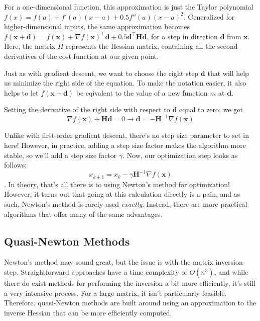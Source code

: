 \documentclass[12pt]{article}
\begin{document}
For a one-dimensional function, this approximation is just the Taylor polynomial 
\(f(x) = f(a) + f'(a)(x-a) + 0.5 f''(a)(x-a)^2\). Generalized for higher-dimensional inputs, the same approximation
becomes \(f(\mathbf{x}+\mathbf{d}) = f(\mathbf{x}) + \nabla f(\mathbf{x})^\top \mathbf{d} + 0.5\mathbf{d}^\top \mathbf{H} \mathbf{d}\),
for a step in direction \(\mathbf{d}\) from \(\mathbf{x}\). Here, the matrix \(H\) represents the Hessian matrix,
containing all the second derivatives of the cost function at our given point. 

Just as with gradient descent, we want to choose the right step \(\mathbf{d}\) that will help us
minimize the right side of the equation. To make the notation easier, it also helps to let \(f(\mathbf{x}+\mathbf{d})\)
be eqivalent to the value of a new function \(m\) at \(\mathbf{d}\).

Setting the derivative of the right side with respect to \(\mathbf{d}\) equal to zero, we get 
\[\nabla f(\mathbf{x}) + \mathbf{Hd} = 0 \to \mathbf{d} = -\mathbf{H}^{-1} \nabla f(\mathbf{x})\]

Unlike with first-order gradient descent, there's no step size parameter to set in here! However, in practice,
adding a step size factor makes the algorithm more stable, so we'll add a step size factor $\gamma$. Now, our optimization step looks
as follows:
\[x_{k+1} = x_{k} - \gamma \mathbf{H}^{-1} \nabla f(\mathbf{x})\].
In theory, that's all there is to using Newton's method for optimization! However, it turns out that going at this calculation directly
is a pain, and as such, Newton's method is rarely used \textit{exactly}. Instead, there are more practical algorithms
that offer many of the same advantages.

\subsection{Quasi-Newton Methods}

Newton's method may sound great, but the issue is with the matrix inversion step. Straightforward approaches have a time complexity 
of \(O(n^3)\), and while there do exist methods for performing the inversion a bit more efficiently, it's still a very intensive
process. For a large matrix, it isn't particularly feasible. Therefore, quasi-Newton methods are built around
using an approximation to the inverse Hessian that can be more efficiently computed.
\end{document}
